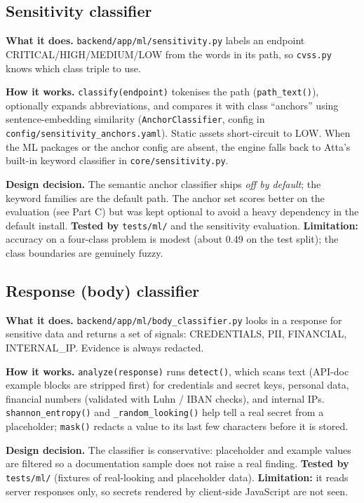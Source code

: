 \subsection{Sensitivity classifier}
\textbf{What it does.} \texttt{backend/app/ml/sensitivity.py} labels an endpoint
CRITICAL/HIGH/MEDIUM/LOW from the words in its path, so \texttt{cvss.py} knows
which class triple to use.

\textbf{How it works.} \texttt{classify(endpoint)} tokenises the path
(\texttt{path\_text()}), optionally expands abbreviations, and compares it with
class ``anchors'' using sentence-embedding similarity
(\texttt{AnchorClassifier}, config in \texttt{config/sensitivity\_anchors.yaml}).
Static assets short-circuit to LOW. When the ML packages or the anchor config are
absent, the engine falls back to Atta's built-in keyword classifier in
\texttt{core/sensitivity.py}.

\textbf{Design decision.} The semantic anchor classifier ships \emph{off by
default}; the keyword families are the default path. The anchor set scores
better on the evaluation (see Part C) but was kept optional to avoid a heavy
dependency in the default install. \textbf{Tested by} \texttt{tests/ml/} and the
sensitivity evaluation. \textbf{Limitation:} accuracy on a four-class problem is
modest (about 0.49 on the test split); the class boundaries are genuinely fuzzy.

\subsection{Response (body) classifier}
\textbf{What it does.} \texttt{backend/app/ml/body\_classifier.py} looks in a
response for sensitive data and returns a set of signals: CREDENTIALS, PII,
FINANCIAL, INTERNAL\_IP. Evidence is always redacted.

\textbf{How it works.} \texttt{analyze(response)} runs \texttt{detect()}, which
scans text (API-doc example blocks are stripped first) for credentials and
secret keys, personal data, financial numbers (validated with Luhn / IBAN
checks), and internal IPs. \texttt{shannon\_entropy()} and
\texttt{\_random\_looking()} help tell a real secret from a placeholder;
\texttt{mask()} redacts a value to its last few characters before it is stored.

\textbf{Design decision.} The classifier is conservative: placeholder and example
values are filtered so a documentation sample does not raise a real finding.
\textbf{Tested by} \texttt{tests/ml/} (fixtures of real-looking and placeholder
data). \textbf{Limitation:} it reads server responses only, so secrets rendered
by client-side JavaScript are not seen.

